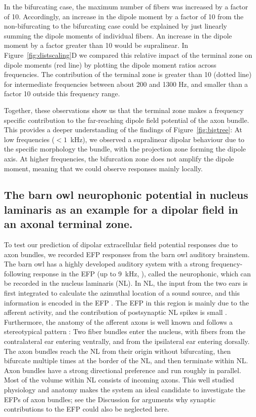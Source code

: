 \documentclass[]{elife}
\begin{document}
In the bifurcating case, the maximum number of fibers was increased by a
factor of 10. Accordingly, an increase in the dipole moment by a factor
of 10 from the non-bifurcating to the bifurcating case could be
explained by just linearly summing the dipole moments of individual
fibers. An increase in the dipole moment by a factor greater than 10
would be supralinear. In Figure~\ref{fig:distscaling}D we compared this
relative impact of the terminal zone on dipole moments (red line) by
plotting the dipole moment ratios across frequencies. The contribution
of the terminal zone is greater than 10 (dotted line) for intermediate
frequencies between about 200 and 1300 Hz, and smaller than a factor 10
outside this frequency range.

Together, these observations show us that the terminal zone makes a
frequency specific contribution to the far-reaching dipole field
potential of the axon bundle. This provides a deeper understanding of
the findings of Figure~\ref{fig:bigtree}: At low frequencies
(\(<1\)~kHz), we observed a supralinear dipolar behaviour due to the
specific morphology the bundle, with the projection zone forming the
dipole axis. At higher frequencies, the bifurcation zone does not
amplify the dipole moment, meaning that we could observe responses
mainly locally.

\subsection{The barn owl neurophonic potential in nucleus laminaris as
an example for a dipolar field in an axonal terminal
zone.}\label{the-barn-owl-neurophonic-potential-in-nucleus-laminaris-as-an-example-for-a-dipolar-field-in-an-axonal-terminal-zone.}

To test our prediction of dipolar extracellular field potential
responses due to axon bundles, we recorded EFP responses from the barn
owl auditory brainstem. The barn owl has a highly developed auditory
system with a strong frequency-following response in the EFP (up to
9~kHz, \citet{Koppl1997b}), called the neurophonic, which can be
recorded in the nucleus laminaris (NL). In NL, the input from the two
ears is first integrated to calculate the azimuthal location of a sound
source, and this information is encoded in the EFP \citep{carr90}. The
EFP in this region is mainly due to the afferent activity, and the
contribution of postsynaptic NL spikes is small
\citep{Kuokkanen2010Origin, Kuokkanen2013Linear}. Furthermore, the
anatomy of the afferent axons is well known and follows a stereotypical
pattern \citep{carr88, carr90}: Two fiber bundles enter the nucleus,
with fibers from the contralateral ear entering ventrally, and from the
ipsilateral ear entering dorsally. The axon bundles reach the NL from
their origin without bifurcating, then bifurcate multiple times at the
border of the NL, and then terminate within NL. Axon bundles have a
strong directional preference and run roughly in parallel. Most of the
volume within NL consists of incoming axons. This well studied
physiology and anatomy makes the system an ideal candidate to
investigate the EFPs of axon bundles; see the Discussion for arguments
why synaptic contributions to the EFP could also be neglected here.
\end{document}
